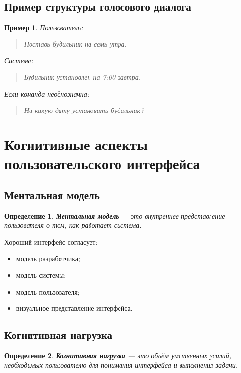 \documentclass[12pt,a4paper]{article}
\newtheorem{definition}{Определение}
\newtheorem{example}{Пример}
\begin{document}
\subsection{Пример структуры голосового диалога}

\begin{example}
Пользователь:
\begin{quote}
Поставь будильник на семь утра.
\end{quote}

Система:
\begin{quote}
Будильник установлен на 7:00 завтра.
\end{quote}

Если команда неоднозначна:
\begin{quote}
На какую дату установить будильник?
\end{quote}
\end{example}

\section{Когнитивные аспекты пользовательского интерфейса}

\subsection{Ментальная модель}

\begin{definition}
\textbf{Ментальная модель} --- это внутреннее представление пользователя о том, как работает система.
\end{definition}

Хороший интерфейс согласует:
\begin{itemize}
    \item модель разработчика;
    \item модель системы;
    \item модель пользователя;
    \item визуальное представление интерфейса.
\end{itemize}

\subsection{Когнитивная нагрузка}

\begin{definition}
\textbf{Когнитивная нагрузка} --- это объём умственных усилий, необходимых пользователю для понимания интерфейса и выполнения задачи.
\end{definition}
\end{document}

